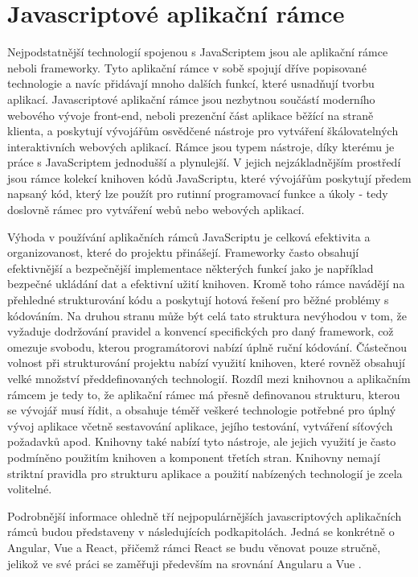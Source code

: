 \chapter{Javascriptové aplikační rámce}
Nejpodstatnější technologií spojenou s JavaScriptem jsou ale aplikační rámce neboli frameworky. Tyto aplikační rámce v sobě spojují dříve popisované technologie a navíc přidávají mnoho dalších funkcí, které usnadňují tvorbu aplikací. Javascriptové aplikační rámce jsou nezbytnou součástí moderního webového vývoje front-end, neboli prezenční část aplikace běžící na straně klienta, a poskytují vývojářům osvědčené nástroje pro vytváření škálovatelných interaktivních webových aplikací. Rámce jsou typem nástroje, díky kterému je práce s JavaScriptem jednodušší a plynulejší. V jejich nejzákladnějším prostředí jsou rámce kolekcí knihoven kódů JavaScriptu, které vývojářům poskytují předem napsaný kód, který lze použít pro rutinní programovací funkce a úkoly - tedy doslovně rámec pro vytváření webů nebo webových aplikací. 

Výhoda v používání aplikačních rámců JavaScriptu je celková efektivita a organizovanost, které do projektu přinášejí. Frameworky často obsahují efektivnější a bezpečnější implementace některých funkcí jako je například bezpečné ukládání dat a efektivní užití knihoven. Kromě toho rámce navádějí na přehledné strukturování kódu a poskytují hotová řešení pro běžné problémy s kódováním. Na druhou stranu může být celá tato struktura nevýhodou v tom, že vyžaduje dodržování pravidel a konvencí specifických pro daný framework, což omezuje svobodu, kterou programátorovi nabízí úplně ruční kódování. Částečnou volnost při strukturování projektu nabízí využití knihoven, které rovněž obsahují velké množství předdefinovaných technologií. Rozdíl mezi knihovnou a aplikačním rámcem je tedy to, že aplikační rámec má přesně definovanou strukturu, kterou se vývojář musí řídit, a obsahuje téměř veškeré technologie potřebné pro úplný vývoj aplikace včetně sestavování aplikace, jejího testování, vytváření síťových požadavků apod. Knihovny také nabízí tyto nástroje, ale jejich využití je často podmíněno použitím knihoven a komponent třetích stran. Knihovny nemají striktní pravidla pro strukturu aplikace a použití nabízených technologií je zcela volitelné.

Podrobnější informace ohledně tří nejpopulárnějších javascriptových aplikačních rámců budou představeny v následujících podkapitolách. Jedná se konkrétně o Angular, Vue a React, přičemž rámci React se budu věnovat pouze stručně, jelikož ve své práci se zaměřuji především na srovnání Angularu a Vue \cite{clientsideframe}.

